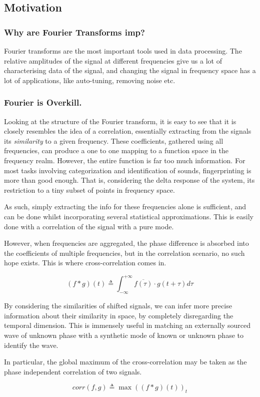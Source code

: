 \subsection{Motivation}

\subsubsection{Why are Fourier Transforms imp?} Fourier transforms are the most important tools used in data processing. The relative amplitudes of the signal at different frequencies give us a lot of characterising data of the signal, and changing the signal in frequency space has a lot of applications, like auto-tuning, removing noise etc. 

\subsubsection{Fourier is Overkill.}
Looking at the structure of the Fourier transform, it is easy to see that it is
closely resembles the idea of a correlation, essentially extracting from the
signals its \emph{similarity} to a given frequency. These coefficients, gathered
using all frequencies, can produce a one to one mapping to a function space in
the frequency realm. However, the entire function is far too much information.
For most tasks involving categorization and identification of sounds,
fingerprinting is more than good enough. That is, considering the delta response
of the system, its restriction to a tiny subset of points in frequency space.

As such, simply extracting the info for these frequencies alone is sufficient,
and can be done whilst incorporating several statistical approximations. This is
easily done with a correlation of the signal with a pure mode. 

However, when frequencies are aggregated, the phase difference is absorbed into
the coefficients of multiple frequencies, but in the correlation scenario, no
such hope exists. This is where cross-correlation comes in. 

\begin{equation}
    (f \ast g)(t) \triangleq \int_{-\infty}^{+\infty} \overline{f(\tau)} \cdot g(t+\tau) d\tau
\end{equation}

By considering the similarities of shifted signals, we can infer more precise
information about their similarity in space, by completely disregarding the
temporal dimension. This is immensely useful in matching an externally sourced
wave of unknown phase with a synthetic mode of known or unknown phase to
identify the wave.

In particular, the global maximum of the cross-correlation may be taken as the
phase independent correlation of two signals.

\begin{equation}
    corr(f, g) \triangleq \max((f \ast g) (t))_t
\end{equation}
